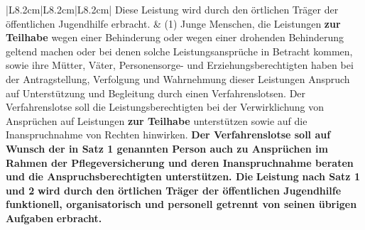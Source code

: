 \documentclass[10pt,a4paper,landscape]{article}
\begin{document}
\begin{longtable}{|L{8.2cm}|L{8.2cm}|L{8.2cm}|}
 \newline \textcolor{diffred}{Diese} Leistung wird durch den örtlichen  \newline Träger der öffentlichen Jugendhilfe  \newline erbracht. & (1) Junge Menschen, die Leistungen \textbf{zur  \newline Teilhabe }wegen einer Behinderung oder  \newline wegen einer drohenden Behinderung  \newline geltend machen oder bei denen solche  \newline Leistungsansprüche in Betracht kommen,  \newline sowie ihre Mütter, Väter, Personensorge-  \newline und Erziehungsberechtigten haben bei der  \newline Antragstellung, Verfolgung und  \newline Wahrnehmung dieser Leistungen Anspruch  \newline auf Unterstützung und Begleitung durch  \newline einen Verfahrenslotsen. Der  \newline Verfahrenslotse soll die  \newline Leistungsberechtigten bei der  \newline Verwirklichung von Ansprüchen auf  \newline Leistungen \textbf{zur Teilhabe} unterstützen  \newline sowie auf die Inanspruchnahme von  \newline Rechten hinwirken. \textbf{\textcolor{diffgreen}{Der Verfahrenslotse  \newline soll auf Wunsch der in Satz 1 genannten  \newline Person auch zu Ansprüchen im Rahmen  \newline der Pflegeversicherung und deren  \newline Inanspruchnahme beraten und die  \newline Anspruchsberechtigten unterstützen.  \newline Die}}\textbf{ Leistung }\textbf{\textcolor{diffgreen}{nach Satz 1 und 2}}\textbf{ wird  \newline durch den örtlichen Träger der  \newline öffentlichen Jugendhilfe }\textbf{\textcolor{diffgreen}{funktionell,  \newline organisatorisch und personell getrennt  \newline von seinen übrigen Aufgaben}}\textbf{ erbracht.} \\

\end{longtable}
\end{document}
